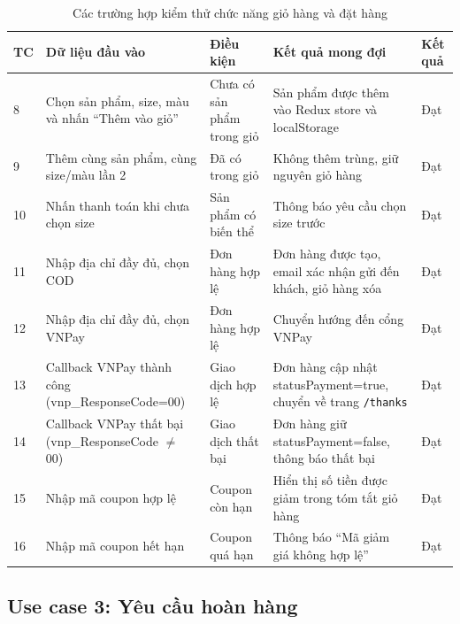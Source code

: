 \documentclass[../DoAn.tex]{subfiles}
\begin{document}
\begin{table}[H]
\centering
\caption{Các trường hợp kiểm thử chức năng giỏ hàng và đặt hàng}
\label{tab:test-cart}
\scriptsize
\begin{tabular}{|p{0.5cm}|p{3.5cm}|p{3cm}|p{3.5cm}|p{2cm}|}
\hline
\textbf{TC} & \textbf{Dữ liệu đầu vào} & \textbf{Điều kiện} & \textbf{Kết quả mong đợi} & \textbf{Kết quả} \\
\hline
8 & Chọn sản phẩm, size, màu và nhấn ``Thêm vào giỏ'' & Chưa có sản phẩm trong giỏ & Sản phẩm được thêm vào \break Redux store và localStorage & Đạt \\
\hline
9 & Thêm cùng sản phẩm, cùng size/màu lần 2 & Đã có trong giỏ & Không thêm trùng, giữ nguyên giỏ hàng & Đạt \\
\hline
10 & Nhấn thanh toán khi chưa chọn size & Sản phẩm có biến thể & Thông báo yêu cầu chọn size trước & Đạt \\
\hline
11 & Nhập địa chỉ đầy đủ, chọn COD & Đơn hàng hợp lệ & Đơn hàng được tạo, email xác nhận gửi đến khách, giỏ hàng xóa & Đạt \\
\hline
12 & Nhập địa chỉ đầy đủ, chọn VNPay & Đơn hàng hợp lệ & Chuyển hướng đến cổng VNPay & Đạt \\
\hline
13 & Callback VNPay thành công (vnp\_ResponseCode=00) & Giao dịch hợp lệ & Đơn hàng cập nhật \break statusPayment=true, chuyển về trang \texttt{/thanks} & Đạt \\
\hline
14 & Callback VNPay thất bại (vnp\_ResponseCode $\neq$ 00) & Giao dịch thất bại & Đơn hàng giữ \break statusPayment=false, thông báo thất bại & Đạt \\
\hline
15 & Nhập mã coupon hợp lệ & Coupon còn hạn & Hiển thị số tiền được giảm trong tóm tắt giỏ hàng & Đạt \\
\hline
16 & Nhập mã coupon hết hạn & Coupon quá hạn & Thông báo ``Mã giảm giá không hợp lệ'' & Đạt \\
\hline
\end{tabular}
\end{table}

\subsection*{Use case 3: Yêu cầu hoàn hàng}
\end{document}
